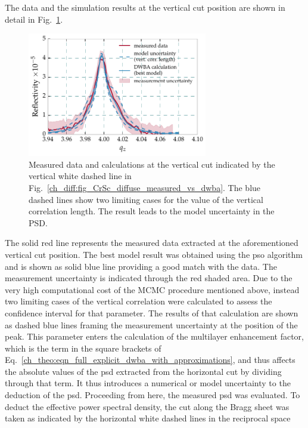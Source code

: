 The data and the simulation results at the vertical cut position are shown in detail in Fig.~\ref{ch_diff:fig_CrSc_diffuse_vertical_correlation}.
\begin{figure}[htbp]
  \centering
  \includegraphics[width=0.7\textwidth]{img/CrSc_diffuse_vertical_correlation}
  \caption{Measured data and calculations at the vertical cut indicated by the vertical white dashed line in Fig.~\ref{ch_diff:fig_CrSc_diffuse_measured_vs_dwba}. The blue dashed lines show two limiting cases for the value of the vertical correlation length. The result leads to the model uncertainty in the PSD.}
  \label{ch_diff:fig_CrSc_diffuse_vertical_correlation}
\end{figure}
The solid red line represents the measured data extracted at the aforementioned vertical cut position. The best model result was obtained using the \gls{pso} algorithm and is shown as solid blue line providing a good match with the data. The measurement uncertainty is indicated through the red shaded area. Due to the very high computational cost of the MCMC procedure mentioned above, instead two limiting cases of the vertical correlation were calculated to assess the confidence interval for that parameter. The results of that calculation are shown as dashed blue lines framing the measurement uncertainty at the position of the peak. This parameter enters the calculation of the multilayer enhancement factor, which is the term in the square brackets of Eq.~\eqref{ch_theo:eqn_full_explicit_dwba_with_approximations}, and thus affects the absolute values of the \gls{psd} extracted from the horizontal cut by dividing through that term. It thus introduces a numerical or model uncertainty to the deduction of the \gls{psd}. Proceeding from here, the measured 
\gls{psd} was evaluated. To deduct the effective power spectral density, the cut along the Bragg sheet was taken as indicated by the horizontal white dashed lines in the reciprocal space 
